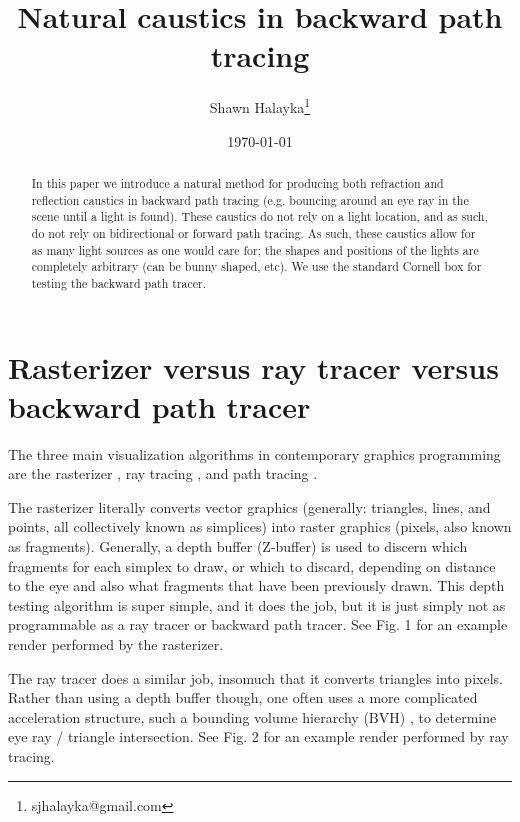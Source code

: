 \documentclass[12pt]{article}
\title{Natural caustics in backward path tracing}
\author{
Shawn Halayka\footnote{sjhalayka@gmail.com}
}
\date{\today\;\currenttime}
\begin{document}
\newcommand{\abs}[1]{\lvert#1\rvert}



\maketitle




\begin{abstract}
In this paper we introduce a natural method for producing both refraction and reflection caustics in backward path tracing (e.g. bouncing around an eye ray in the scene until a light is found).
These caustics do not rely on a light location, and as such, do not rely on bidirectional or forward path tracing.
As such, these caustics allow for as many light sources as one would care for; the shapes and positions of the lights are completely arbitrary (can be bunny shaped, etc).
We use the standard Cornell box for testing the backward path tracer.
\end{abstract}







\section{Rasterizer versus ray tracer versus backward path tracer}

The three main visualization algorithms in contemporary graphics programming are the rasterizer \cite{noll, wikipedia1}, ray tracing \cite{appel, wikipedia2}, and path tracing \cite{kajiya, wikipedia3}.

The rasterizer literally converts vector graphics (generally: triangles, lines, and points, all collectively known as simplices) into raster graphics (pixels, also known as fragments).
Generally, a depth buffer (Z-buffer) \cite{wikipedia4} is used to discern which fragments for each simplex to draw, or which to discard, depending on distance to the eye and also what fragments that have been previously drawn.
This depth testing algorithm is super simple, and it does the job, but it is just simply not as programmable as a ray tracer or backward path tracer.
See Fig. 1 for an example render performed by the rasterizer.

The ray tracer does a similar job, insomuch that it converts triangles into pixels.
Rather than using a depth buffer though, one often uses a more complicated acceleration structure, such a bounding volume hierarchy (BVH) \cite{wikipedia5}, to determine eye ray / triangle intersection.
See Fig. 2 for an example render performed by ray tracing.
\end{document}
